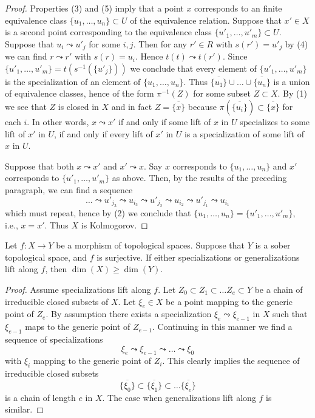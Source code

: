 \begin{proof}
Properties (3) and (5) imply that a point $x$ corresponds to an
finite equivalence class $\{u_1, \ldots, u_n\} \subset U$ of the equivalence
relation. Suppose that $x' \in X$ is a second point corresponding to
the equivalence class $\{u'_1, \ldots, u'_m\} \subset U$.
Suppose that $u_i \leadsto u'_j$ for some $i, j$. Then for any
$r' \in R$ with $s(r') = u'_j$ by (4) we can find $r \leadsto r'$
with $s(r) = u_i$. Hence $t(t) \leadsto t(r')$. Since
$\{u'_1, \ldots, u'_m\} = t(s^{-1}(\{u'_j\}))$ we conclude that
every element of $\{u'_1, \ldots, u'_m\}$ is the specialization of
an element of $\{u_1, \ldots, u_n\}$.
Thus $\overline{\{u_1\}} \cup \ldots \cup \overline{\{u_n\}}$ is
a union of equivalence classes, hence of the form $\pi^{-1}(Z)$
for some subset $Z \subset X$. By (1) we see that $Z$ is closed in $X$
and in fact $Z = \overline{\{x\}}$ because $\pi(\overline{\{u_i\}})
\subset \overline{\{x\}}$ for each $i$. In other words, $x \leadsto x'$
if and only if some lift of $x$ in $U$ specializes to some lift of
$x'$ in $U$, if and only if every lift of $x'$ in $U$ is a specialization
of some lift of $x$ in $U$.

\medskip\noindent
Suppose that both $x \leadsto x'$ and $x' \leadsto x$. Say $x$ corresponds
to $\{u_1, \ldots, u_n\}$ and $x'$ corresponds to $\{u'_1, \ldots, u'_m\}$
as above. Then, by the results of the preceding paragraph, we can find a
sequence
$$
\ldots \leadsto u'_{j_3} \leadsto u_{i_3} \leadsto u'_{j_2} \leadsto
u_{i_2} \leadsto u'_{j_1} \leadsto u_{i_1}
$$
which must repeat, hence by (2) we conclude that
$\{u_1, \ldots, u_n\} = \{u'_1, \ldots, u'_m\}$, i.e., $x = x'$.
Thus $X$ is Kolmogorov.
\end{proof}


\begin{lemma}
\label{lemma-dimension-specializations-lift}
Let $f : X \to Y$ be a morphism of topological spaces.
Suppose that $Y$ is a sober topological space, and $f$ is surjective.
If either specializations or generalizations lift along $f$, then
$\dim(X) \geq \dim(Y)$.
\end{lemma}

\begin{proof}
Assume specializations lift along $f$.
Let $Z_0 \subset Z_1 \subset \ldots Z_e \subset Y$ be a chain
of irreducible closed subsets of $X$. Let $\xi_e \in X$ be a point
mapping to the generic point of $Z_e$. By assumption there
exists a specialization
$\xi_e \leadsto \xi_{e - 1}$ in $X$ such that $\xi_{e - 1}$ maps to
the generic point of $Z_{e - 1}$. Continuing in this manner we find
a sequence of specializations
$$
\xi_e \leadsto \xi_{e - 1} \leadsto \ldots \leadsto \xi_0
$$
with $\xi_i$ mapping to the generic point of $Z_i$.
This clearly implies the sequence of irreducible closed
subsets
$$
\overline{\{\xi_0\}} \subset
\overline{\{\xi_1\}} \subset \ldots
\overline{\{\xi_e\}}
$$
is a chain of length $e$ in $X$.
The case when generalizations lift along $f$ is similar.
\end{proof}

